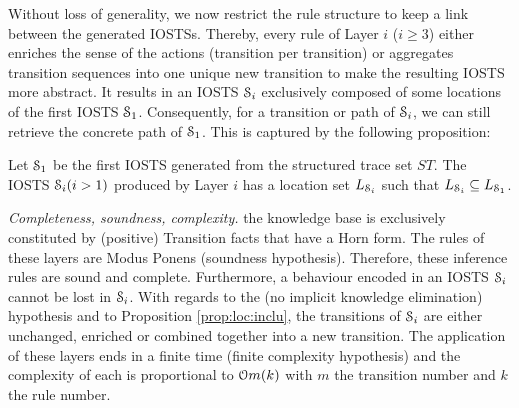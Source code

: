Without loss of generality, we now restrict the rule structure to
keep a link between the generated IOSTSs. Thereby, every rule of
Layer $i$ ($i \geq 3$) either enriches the sense of the actions
(transition per transition) or aggregates transition sequences
into one unique new transition to make the resulting IOSTS more
abstract. It results in an IOSTS $\EuScript{S}_i$ exclusively
composed of some locations of the first IOSTS $\EuScript{S}_1$.
Consequently, for a transition or path of $\EuScript{S}_i$, we
can still retrieve the concrete path of $\EuScript{S}_1$. This is
captured by the following proposition:

\begin{proposition}
\label{prop:loc:inclu}
Let $\EuScript{S}_1$ be the first IOSTS generated from the
structured trace set $ST$. The IOSTS $\EuScript{S}_i (i>1)$
produced by Layer $i$ has a location set $L_{\EuScript{S}_i}$
such that $L_{\EuScript{S}_i} \subseteq L_{\EuScript{S}_1}$.
\end{proposition}

\textit{Completeness, soundness, complexity.} the knowledge base
is exclusively constituted by (positive) Transition facts that
have a Horn form. The rules of these layers are Modus Ponens
(soundness hypothesis). Therefore, these inference rules are
sound and complete. Furthermore, a behaviour encoded in an IOSTS
$\EuScript{S}_i$ cannot be lost in $\EuScript{S}_i$. With regards
to the (no implicit knowledge elimination) hypothesis and to
Proposition \ref{prop:loc:inclu}, the transitions of
$\EuScript{S}_i$ are either unchanged, enriched or combined
together into a new transition. The application of these layers
ends in a finite time (finite complexity hypothesis) and the
complexity of each is proportional to $\EuScript{O}m(k)$ with $m$
the transition number and $k$ the rule number.

